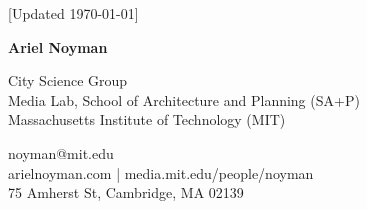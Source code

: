 \documentclass[10pt]{book}
\newcommand{\myname}{Ariel Noyman}
\begin{document}
\pagestyle{empty}
\begin{center}
    \vfill
    \small {[Updated \monthyeardate\today]}
\end{center}
\vspace{2em}


\begin{flushleft}
    {\Huge\bfseries {\myname}}
\end{flushleft}

\begin{minipage}[t]{0.52\textwidth}
    \vspace{0pt}
    City Science Group\\
    Media Lab, School of Architecture and Planning (SA+P)\\
    Massachusetts Institute of Technology (MIT)
\end{minipage}%
\begin{minipage}[t]{0.48\textwidth}
    \vspace{0pt}
    \raggedleft
    noyman@mit.edu\\
    arielnoyman.com | media.mit.edu/people/noyman\\
    75 Amherst St, Cambridge, MA 02139
\end{minipage}














\end{document}

